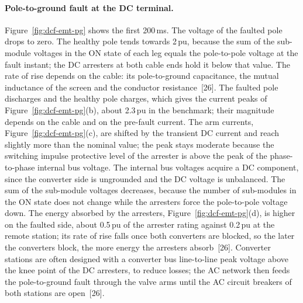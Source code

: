 \paragraph{Pole-to-ground fault at the DC terminal.}
Figure~\ref{fig:dcf-emt-pg} shows the first 200\,ms. The voltage of the
faulted pole drops to zero. The healthy pole tends towards 2\,pu, because
the sum of the sub-module voltages in the ON state of each leg equals the
pole-to-pole voltage at the fault instant; the DC arresters at both cable
ends hold it below that value. The rate of rise depends on the cable: its
pole-to-ground capacitance, the mutual inductance of the screen and the
conductor resistance~[26]. The faulted pole discharges and the healthy pole
charges, which gives the current peaks of
Figure~\ref{fig:dcf-emt-pg}(b), about 2.3\,pu in the benchmark; their
magnitude depends on the cable and on the pre-fault current. The arm
currents, Figure~\ref{fig:dcf-emt-pg}(c), are shifted by the transient DC
current and reach slightly more than the nominal value; the peak stays
moderate because the switching impulse protective level of the arrester is
above the peak of the phase-to-phase internal bus voltage. The internal bus
voltages acquire a DC component, since the converter side is ungrounded and
the DC voltage is unbalanced. The sum of the sub-module voltages
decreases, because the number of sub-modules in the ON state does not
change while the arresters force the pole-to-pole voltage down. The energy
absorbed by the arresters, Figure~\ref{fig:dcf-emt-pg}(d), is higher on the
faulted side, about 0.5\,pu of the arrester rating against 0.2\,pu at the
remote station; its rate of rise falls once both converters are blocked, so
the later the converters block, the more energy the arresters absorb~[26].
Converter stations are often designed with a converter bus line-to-line
peak voltage above the knee point of the DC arresters, to reduce losses;
the AC network then feeds the pole-to-ground fault through the valve arms
until the AC circuit breakers of both stations are open~[26].

